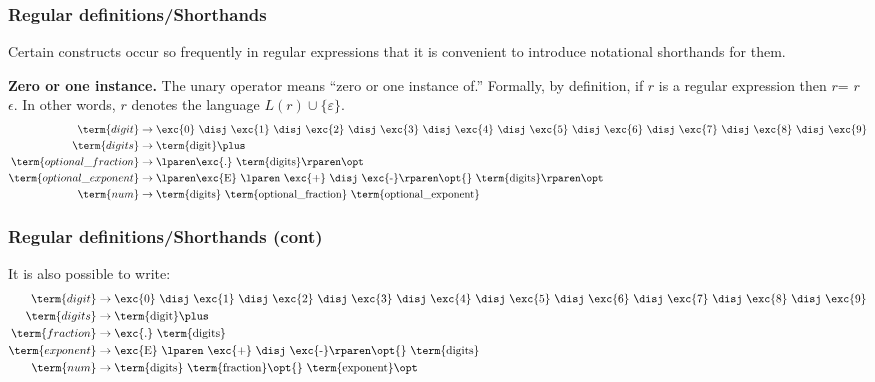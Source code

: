 % 
\begin{frame}
\frametitle{Regular definitions/Shorthands}

Certain constructs occur so frequently in regular expressions that it
is convenient to introduce notational shorthands for them.

\bigskip

\textbf{Zero or one instance.} The unary operator \opt{} means ``zero
or one instance of.'' Formally, by definition, if \(r\) is a regular
expression then \(r\)\opt = \(r\) \disj \(\epsilon\). In other
words, \lparen\(r\)\rparen\opt{} denotes the
language \(L(r) \cup \{\varepsilon\}\).
\begin{align*}
\term{digit} & \rightarrow \text{\exc{0} \disj \exc{1} \disj \exc{2}
  \disj \exc{3} \disj \exc{4} \disj \exc{5} \disj \exc{6} \disj
  \exc{7} \disj \exc{8} \disj \exc{9}}\\
\term{digits} & \rightarrow \text{\term{digit}\plus}\\
\term{optional\_fraction} & \rightarrow \text{\lparen\exc{.}
  \term{digits}\rparen\opt}\\
\term{optional\_exponent} & \rightarrow \text{\lparen\exc{E} \lparen
  \exc{+} \disj \exc{-}\rparen\opt{} \term{digits}\rparen\opt}\\
\term{num} & \rightarrow \text{\term{digits} \term{optional\_fraction}
  \term{optional\_exponent}}
\end{align*}

\end{frame}

% 
\begin{frame}
\frametitle{Regular definitions/Shorthands (cont)}

It is also possible to write:
\begin{align*}
\term{digit} & \rightarrow \text{\exc{0} \disj \exc{1} \disj \exc{2}
  \disj \exc{3} \disj \exc{4} \disj \exc{5} \disj \exc{6} \disj
  \exc{7} \disj \exc{8} \disj \exc{9}}\\
\term{digits} & \rightarrow \text{\term{digit}\plus}\\
\term{fraction} & \rightarrow \text{\exc{.} \term{digits}}\\
\term{exponent} & \rightarrow \text{\exc{E} \lparen \exc{+} \disj
  \exc{-}\rparen\opt{} \term{digits}}\\
\term{num} & \rightarrow \text{\term{digits} \term{fraction}\opt{}
  \term{exponent}\opt}
\end{align*}

\end{frame}

